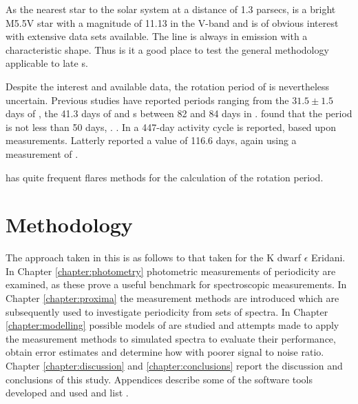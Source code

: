 As the nearest star to the solar system at a distance of 1.3 parsecs, {\prox} is a bright M5.5V star with a magnitude of
11.13 in the V-band and is of obvious interest with extensive data sets available. The {\ha} line is always in emission
with a characteristic shape. Thus is it a good place to test the general methodology applicable to late \rdwarf s.

Despite the interest and available data, the rotation period of {\prox} is nevertheless uncertain.  Previous studies
have reported periods ranging from the $ 31.5 \pm 1.5 $ days of \citet{guinan96}, the 41.3 days of \citet{benedict93}
and s between 82 and 84 days in \citealt{benedict92,benedict98}.  \citet{kurster99} found that the period is not less
than 50 days, . .  In \citet{cincunegui07} a 447-day activity cycle is reported,
based upon {\ha} measurements. Latterly \citet[Table 3]{suarezmascareno15} reported a value of 116.6 days, again using a
measurement of {\ha}.

{\prox} has quite frequent flares  methods for the calculation of the rotation period.

\section{Methodology}
\protect\label{section:methodology}

The approach taken in this {\paperorthesis} is as follows  to that taken 
\citet{giguere16} for the K dwarf $\epsilon$ Eridani. In Chapter \ref{chapter:photometry} photometric measurements of
 periodicity  {\prox} are examined, as these prove a useful benchmark for
spectroscopic measurements. In Chapter \ref{chapter:proxima} the measurement methods are introduced which are
subsequently used to investigate periodicity from sets of spectra. In Chapter \ref{chapter:modelling} possible models of
{\prox} are studied and attempts  made to apply the measurement methods to simulated spectra to evaluate their
performance, obtain error estimates and determine how  with poorer signal to noise ratio. Chapter
\ref{chapter:discussion} and \ref{chapter:conclusions} report the discussion and conclusions of this study. Appendices
describe some of the software tools developed and used and list .
